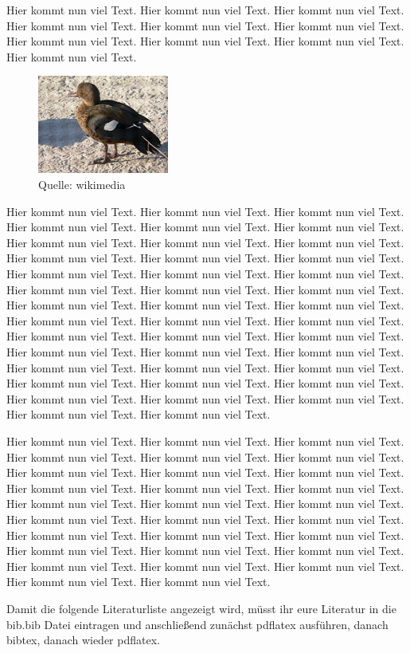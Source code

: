 \documentclass{article}
\begin{document}
Hier kommt nun viel Text. Hier kommt nun viel Text. Hier kommt nun viel Text. Hier kommt nun viel Text. Hier kommt nun viel Text. Hier kommt nun viel Text. Hier kommt nun viel Text. Hier kommt nun viel Text. Hier kommt nun viel Text. Hier kommt nun viel Text.
\begin{figure} %
    \includegraphics[width=4.3cm]{images/Ente}
    \caption{\small{Quelle: wikimedia}}
\end{figure}
Hier kommt nun viel Text. Hier kommt nun viel Text. Hier kommt nun viel Text. Hier kommt nun viel Text. Hier kommt nun viel Text. Hier kommt nun viel Text. Hier kommt nun viel Text. Hier kommt nun viel Text. Hier kommt nun viel Text. Hier kommt nun viel Text.  Hier kommt nun viel Text. Hier kommt nun viel Text. Hier kommt nun viel Text. Hier kommt nun viel Text. Hier kommt nun viel Text. Hier kommt nun viel Text. Hier kommt nun viel Text. Hier kommt nun viel Text. Hier kommt nun viel Text. Hier kommt nun viel Text. Hier kommt nun viel Text. Hier kommt nun viel Text. Hier kommt nun viel Text. Hier kommt nun viel Text. Hier kommt nun viel Text. Hier kommt nun viel Text. Hier kommt nun viel Text. Hier kommt nun viel Text. Hier kommt nun viel Text. Hier kommt nun viel Text. Hier kommt nun viel Text. Hier kommt nun viel Text. Hier kommt nun viel Text. Hier kommt nun viel Text. Hier kommt nun viel Text. Hier kommt nun viel Text. Hier kommt nun viel Text. Hier kommt nun viel Text. Hier kommt nun viel Text. Hier kommt nun viel Text.   Hier kommt nun viel Text.
\par\smallskip %
Hier kommt nun viel Text. Hier kommt nun viel Text. Hier kommt nun viel Text. Hier kommt nun viel Text. Hier kommt nun viel Text. Hier kommt nun viel Text. Hier kommt nun viel Text. Hier kommt nun viel Text. Hier kommt nun viel Text. Hier kommt nun viel Text. Hier kommt nun viel Text. Hier kommt nun viel Text. Hier kommt nun viel Text.   Hier kommt nun viel Text. Hier kommt nun viel Text. Hier kommt nun viel Text. Hier kommt nun viel Text. Hier kommt nun viel Text. Hier kommt nun viel Text. Hier kommt nun viel Text. Hier kommt nun viel Text. Hier kommt nun viel Text. Hier kommt nun viel Text.   Hier kommt nun viel Text. Hier kommt nun viel Text. Hier kommt nun viel Text. Hier kommt nun viel Text. Hier kommt nun viel Text.   Hier kommt nun viel Text.
\par\bigskip %

Damit die folgende Literaturliste angezeigt wird, müsst ihr eure Literatur in die bib.bib Datei eintragen und anschließend zunächst pdflatex ausführen, danach bibtex, danach wieder pdflatex.

\appendix




\end{document}
